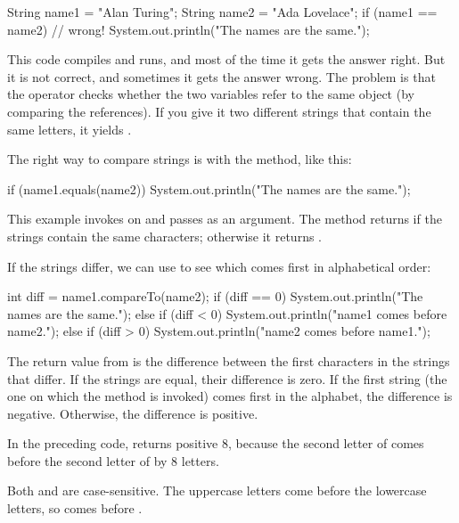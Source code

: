 \begin{code}
String name1 = "Alan Turing";
String name2 = "Ada Lovelace";
if (name1 == name2) {                 // wrong!
    System.out.println("The names are the same.");
}
\end{code}

This code compiles and runs, and most of the time it gets the answer right.
But it is not correct, and sometimes it gets the answer wrong.
The problem is that the \java{==} operator checks whether the two variables refer to the same object (by comparing the references).
If you give it two different strings that contain the same letters, it yields .

The right way to compare strings is with the  method, like this:

\begin{code}
if (name1.equals(name2)) {
    System.out.println("The names are the same.");
}
\end{code}

This example invokes  on  and passes  as an argument.
The  method returns  if the strings contain the same characters; otherwise it returns .

If the strings differ, we can use  to see which comes first in alphabetical order:

\begin{code}
int diff = name1.compareTo(name2);
if (diff == 0) {
    System.out.println("The names are the same.");
} else if (diff < 0) {
    System.out.println("name1 comes before name2.");
} else if (diff > 0) {
    System.out.println("name2 comes before name1.");
}
\end{code}

The return value from  is the difference between the first characters in the strings that differ.
If the strings are equal, their difference is zero.
If the first string (the one on which the method is invoked) comes first in the alphabet, the difference is negative.
Otherwise, the difference is positive.

In the preceding code,  returns positive 8, because the second letter of  comes before the second letter of  by 8 letters.


Both  and  are case-sensitive.
The uppercase letters come before the lowercase letters, so  comes before .



